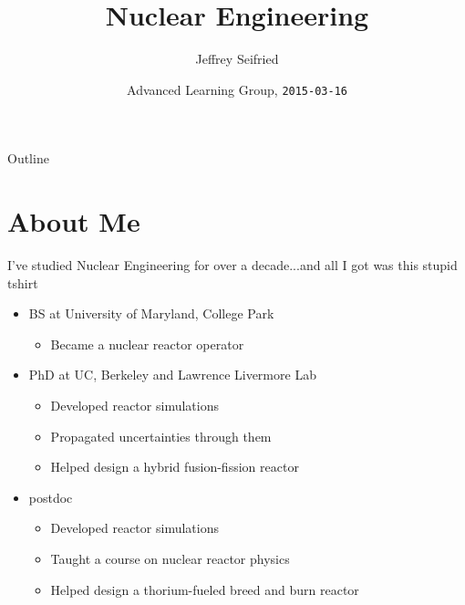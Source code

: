\documentclass{beamer}
\title{Nuclear Engineering}
\author{Jeffrey Seifried}
\institute{Ad Delivery Team, Yelp}
\date{Advanced Learning Group, \texttt{2015-03-16}}
\begin{document}
\begin{frame}
  \titlepage
\end{frame}

\begin{frame}{Outline}
  \tableofcontents
\end{frame}


\section{About Me}

    \begin{frame}{I've studied Nuclear Engineering for over a decade}{...and all I got was this stupid tshirt}

        \begin{itemize}

            \item BS at University of Maryland, College Park
            \begin{itemize}
                \item Became a nuclear reactor operator
            \end{itemize}

            \pause

            \item PhD at UC, Berkeley and Lawrence Livermore Lab
            \begin{itemize}
                \item Developed reactor simulations
                \item Propagated uncertainties through them
                \item Helped design a hybrid fusion-fission reactor
            \end{itemize}

            \pause

            \item postdoc
            \begin{itemize}
                \item Developed reactor simulations
                \item Taught a course on nuclear reactor physics
                \item Helped design a thorium-fueled breed and burn reactor
            \end{itemize}
        \end{itemize}

    \end{frame}
\end{document}
